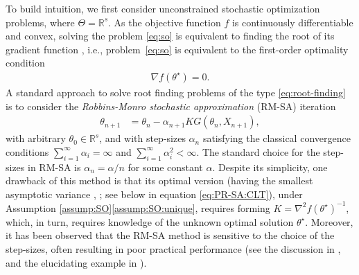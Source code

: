 \documentclass[11pt,a4paper]{article}
\theoremstyle{definition}
\begin{document}
To build intuition, we first consider unconstrained stochastic optimization problems, where $\Theta = \mathbb R^s$.
As the objective function $f$ is continuously differentiable and convex, solving the problem \eqref{eq:so} is equivalent to finding the root of its gradient function \citep[Proposition 5.4.7]{bertsekas2009convex}, i.e., problem~\eqref{eq:so} is equivalent to the first-order optimality condition
\begin{align}
  \label{eq:root-finding}
    \nabla f(\theta^\star)= 0.
\end{align}
A standard approach to solve root finding problems of the type \eqref{eq:root-finding} is to consider the \emph{Robbins-Monro stochastic approximation} (RM-SA) iteration
\begin{align}
\label{eq:SA}
    \theta_{n+1} &= \theta_n - \alpha_{n+1} K G(\theta_n, X_{n+1}),
\end{align}
with arbitrary $\theta_0 \in \mathbb R^s$, and with step-sizes $\alpha_{n}$ satisfying the classical convergence conditions $\sum_{i=1}^\infty \alpha_i = \infty$ and $\sum_{i=1}^\infty \alpha_i^2 < \infty$.
The standard choice for the step-sizes in RM-SA is $\alpha_n = \alpha/n$ for some constant $\alpha$.
Despite its simplicity, one drawback of this method is that its optimal version (having the smallest asymptotic variance \citep{polyak1992acceleration}, \cite[Chapter~VIII-3]{asmussen2007stochastic}; see below in equation \eqref{eq:PR-SA:CLT}), under Assumption \ref{assump:SO}\ref{assump:SO:unique}, requires forming $ K = \nabla^2 f(\theta^\star)^{-1}$, which, in turn, requires knowledge of the unknown optimal solution $\theta^\star$. Moreover, it has been observed that the RM-SA method is sensitive to the choice of the step-sizes, often resulting in poor practical performance (see the discussion in \cite[Section~4.5.3]{spall2005introduction}, and the elucidating example in \cite[Section~2.1]{nemirovski2009robust}).
\end{document}
